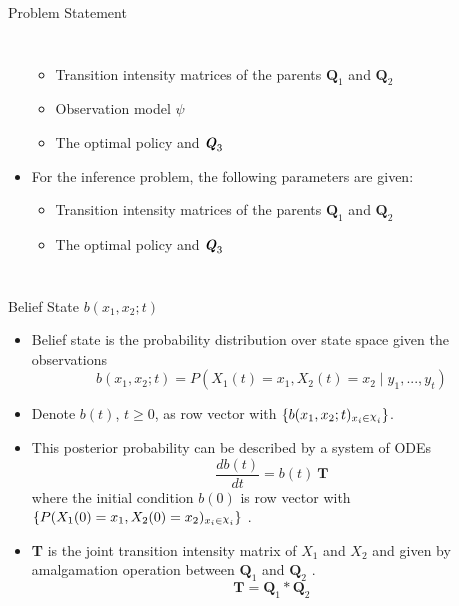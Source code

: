 \documentclass[
	english,%
	aspectratio=169,%
	color={accentcolor=3b},
	logo=true,%
	colorframetitle=false,%
	]{tudabeamer}
\DeclareRobustCommand{\rchi}{{\mathpalette\irchi\relax}}
\newcommand{\irchi}[2]{\raisebox{\depth}{$#1\chi$}}
\begin{document}
\begin{frame}{Problem Statement}
\begin{columns}[onlytextwidth,c]
\begin{itemize}
		\begin{itemize}
			\item Transition intensity matrices of the parents $ \textbf{Q}_{1} $ and $ \textbf{Q}_{2} $
			\item Observation model $ \psi $
			\item The optimal policy and $ \textbf{\textit{Q}}_{3} $
		\end{itemize}
		\item For the inference problem, the following parameters are given:
		\begin{itemize}
			\item Transition intensity matrices of the parents $ \textbf{Q}_{1} $ and $ \textbf{Q}_{2} $
			\item The optimal policy and $ \textbf{\textit{Q}}_{3} $
		\end{itemize}
	\end{itemize}
\end{columns}
\end{frame}


\begin{frame}{Belief State $ b(x_{1}, x_{2}; t) $}
\begin{itemize}
	\item Belief state is the probability distribution over state space given the observations
	\begin{equation}
	b(x_{1}, x_{2}; t) = P( X_{1}(t) = x_{1},  X_{2}(t) = x_{2}\mid y_{1}, ..., y_{t})
	\end{equation}
	\item Denote $ b(t) $, $ t \geq 0 $, as row vector with $ \left\lbrace b(x_{1}, x_{2};t)_{x_{i} \in \rchi_{i}}\right\rbrace  $.
	\item This posterior probability can be described by a system of ODEs
	\begin{equation}
	\frac{db(t)}{dt} = b(t)\ \textbf{T}
	\end{equation}
	where the initial condition $ b(0) $ is row vector with $ \left\lbrace P(X_{1}(0)=x_{1}, X_{2}(0)=x_{2})_{x_{i} \in \rchi_{i}}\right\rbrace $ \cite{article}.
	\item \textbf{T} is the joint transition intensity matrix of $ X_{1} $ and $ X_{2} $ and given by amalgamation operation between $ \textbf{Q}_{1} $ and  $ \textbf{Q}_{2} $ \cite{Nodelman1995}.
	\begin{equation}
	\textbf{T} = \textbf{Q}_{1} * \textbf{Q}_{2}
	\end{equation}
\end{itemize}
\end{frame}
\end{document}
